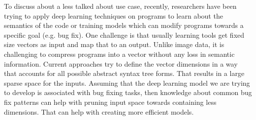 \documentclass{article}
\begin{document}
To discuss about a less talked about use case, recently, researchers have been trying to apply deep learning techniques on programs to learn about the semantics of the code or training models which can modify programs towards a specific goal (e.g. bug fix). One challenge is that usually learning tools get fixed size vectors as input and map that to an output. Unlike image data, it is challenging to compress programs into a vector without any loss in semantic information. Current approaches try to define the vector dimensions in a way that accounts for all possible abstract syntax tree forms. That results in a large sparse space for the inputs. Assuming that the deep learning model we are trying to develop is associated with bug fixing tasks, then knowledge about common bug fix patterns can help with pruning input space towards containing less dimensions. That can help with creating more efficient models.
\end{document}
